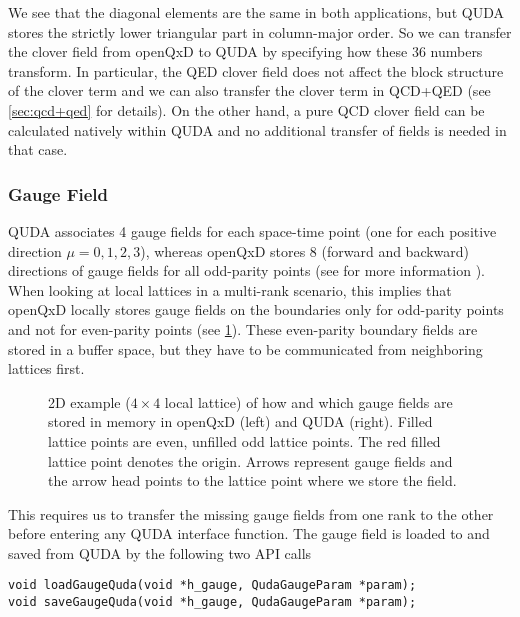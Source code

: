 We see that the diagonal elements are the same in both applications, but QUDA stores the strictly lower triangular part in column-major order. 
So we can transfer the clover field from openQxD to QUDA by specifying how these 36 numbers transform. In particular, the QED
clover field does not affect the block structure of the clover term and we can also transfer the clover term in QCD+QED (see \cref{sec:qcd+qed}
for details).
On the other hand, a pure QCD clover field can be calculated natively within QUDA and no additional transfer of fields is needed in that case.

\subsubsection{Gauge Field}
    QUDA associates 4 gauge fields for each space-time point (one for each positive direction $\mu=0,1,2,3$), whereas openQxD stores $8$
    (forward and backward) directions of gauge fields for all odd-parity points (see  for more information \cite{openqxd}). When looking at local lattices in a multi-rank scenario, this implies that openQxD locally stores gauge fields on the boundaries only for odd-parity points and not for even-parity points (see \cref{fig:gauge}). These even-parity boundary fields are stored in a buffer space, but they have to be communicated from neighboring lattices first.

\begin{figure}
  \caption{2D example ($4 \times 4$ local lattice) of how and which gauge fields are stored in memory in openQxD (left) and QUDA (right). Filled lattice points are even, unfilled odd lattice points. The red filled lattice point denotes the origin. Arrows represent gauge fields and the arrow head points to the lattice point where we store the field.}
  \label{fig:gauge}
\end{figure}

This requires us to transfer the missing gauge fields from one rank to the other before entering any QUDA interface function. The gauge field is loaded to and saved from QUDA by the following two API calls

\begin{verbatim}
void loadGaugeQuda(void *h_gauge, QudaGaugeParam *param);
void saveGaugeQuda(void *h_gauge, QudaGaugeParam *param);
\end{verbatim}

